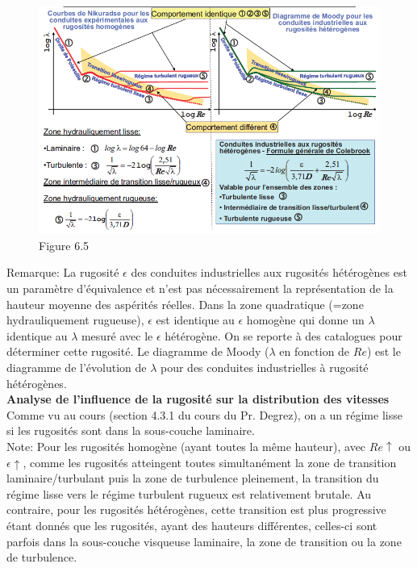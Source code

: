 \begin{figure}[h]
\begin{center}
\includegraphics[scale=0.4]{ch6/66.png}
\caption*{Figure 6.5}
\end{center}
\end{figure}

Remarque: La rugosité $\epsilon$ des conduites industrielles aux rugosités hétérogènes est un paramètre d'équivalence et n'est pas nécessairement la représentation de la hauteur moyenne des aspérités réelles. Dans la zone quadratique (=zone hydrauliquement rugueuse), $\epsilon$ est identique au $\epsilon$ homogène qui donne un $\lambda$ identique au $\lambda$ mesuré avec le $\epsilon$ hétérogène. On se reporte à des catalogues pour déterminer cette rugosité. Le diagramme de Moody ($\lambda$ en fonction de $Re$) est le diagramme de l'évolution de $\lambda$ pour des conduites industrielles à rugosité hétérogènes.
\\

\textbf{Analyse de l'influence de la rugosité sur la distribution des vitesses} 
\\
Comme vu au cours (section 4.3.1 du cours du Pr. Degrez), on a un régime lisse si les rugosités sont dans la sous-couche laminaire.
\\

Note: Pour les rugosités homogène (ayant toutes la même hauteur), avec $Re \uparrow$ ou $\epsilon \uparrow$, comme les rugosités atteingent toutes simultanément la zone de transition laminaire/turbulant puis la zone de turbulence pleinement, la transition du régime lisse vers le régime turbulent rugueux est relativement brutale. Au contraire, pour les rugosités hétérogènes, cette transition est plus progressive étant donnés que les rugosités, ayant des hauteurs différentes, celles-ci sont parfois dans la sous-couche visqueuse laminaire, la zone de transition ou la zone de turbulence.
\\

